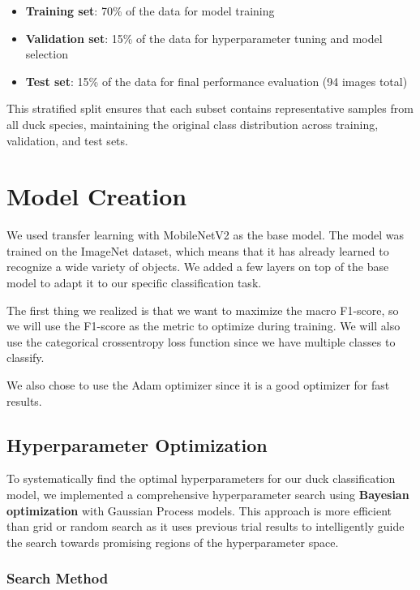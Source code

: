 \documentclass[12pt,a4paper]{article}
\begin{document}
\begin{itemize}
    \item \textbf{Training set}: 70\% of the data for model training
    \item \textbf{Validation set}: 15\% of the data for hyperparameter tuning and model selection
    \item \textbf{Test set}: 15\% of the data for final performance evaluation (94 images total)
\end{itemize}

This stratified split ensures that each subset contains representative samples from all duck species, maintaining the original class distribution across training, validation, and test sets.

\section{Model Creation}

We used transfer learning with MobileNetV2 as the base model. The model was trained on the ImageNet dataset, which means that it has already learned to recognize a wide variety of objects. We added a few layers on top of the base model to adapt it to our specific classification task.

The first thing we realized is that we want to maximize the macro F1-score, so we will use the F1-score as the metric to optimize during training. We will also use the categorical crossentropy loss function since we have multiple classes to classify.

We also chose to use the Adam optimizer since it is a good optimizer for fast results.

\subsection{Hyperparameter Optimization}

To systematically find the optimal hyperparameters for our duck classification model, we implemented a comprehensive hyperparameter search using \textbf{Bayesian optimization} with Gaussian Process models. This approach is more efficient than grid or random search as it uses previous trial results to intelligently guide the search towards promising regions of the hyperparameter space.

\subsubsection{Search Method}
\end{document}

